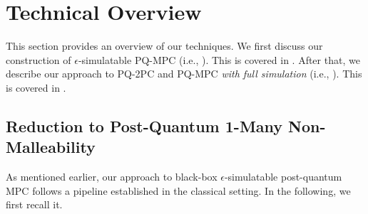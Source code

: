 
\section{Technical Overview}
\label{sec:tech-overview}

This section provides an overview of our techniques. We first discuss our construction of $\epsilon$-simulatable PQ-MPC (i.e., ). This is covered in . After that, we describe our approach to PQ-2PC and PQ-MPC {\em with full simulation} (i.e., ). This is covered in .


\subsection{Reduction to Post-Quantum 1-Many Non-Malleability}
\label{sec:tech-oeverview:reduction-to-NMC}
As mentioned earlier, our approach to black-box $\epsilon$-simulatable post-quantum MPC follows a pipeline established in the classical setting. In the following, we first recall it.

